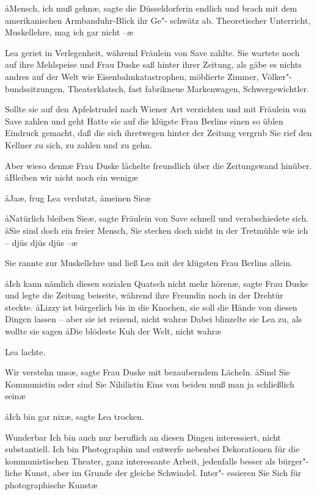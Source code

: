 \aa{}Mensch, ich muß gehn\ae{}, sagte die Düsseldorferin endlich und
brach mit dem amerikanischen Armbanduhr-Blick ihr Ge"-%
schwätz ab. \aanah{}Theoretischer Unterricht, Muskellehre, mag ich
gar nicht --\ae{}

Lea geriet in Verlegenheit, während Fräulein von Save
zahlte. Sie wartete noch auf ihre Mehlspeise und Frau Duske
saß hinter ihrer Zeitung, als gäbe es nichts andres auf der
Welt wie Eisenbahnkatastrophen, möblierte Zimmer, Völker"-%
bundssitzungen, Theaterklatsch, fast fabrikneue Markenwagen,
Schwergewichtler.

Sollte sie auf den Apfelstrudel nach Wiener Art verzichten
und mit Fräulein von Save zahlen und geht\frag{} Hatte sie auf
die klügste Frau Berlins einen so üblen Eindruck gemacht,
daß die sich ihretwegen hinter der Zeitung vergrub\frag{} Sie rief
den Kellner zu sich, zu zahlen und zu gehn.

\aanah{}Aber wieso denn\frag{}\ae{} Frau Duske lächelte freundlich über die
Zeitungswand hinüber. \aa{}Bleiben wir nicht noch ein wenig\frag{}\ae{}

\aa{}Ja\frag{}\ae{}, frug Lea verdutzt, \aa{}meinen Sie\frag{}\ae{}

\aa{}Natürlich bleiben Sie\ae{}, sagte Fräulein von Save schnell
und verabschiedete sich. \aa{}Sie sind doch ein freier Mensch, Sie
stecken doch nicht in der Tretmühle wie ich -- djüs djüs djüs --\ae{}

Sie rannte zur Muskellehre und ließ Lea mit der klügsten
Frau Berlins allein.

\aa{}Ich kann nämlich diesen sozialen Quatsch nicht mehr hören\ae{},
sagte Frau Duske und legte die Zeitung beiseite, während
ihre Freundin noch in der Drehtür steckte. \aa{}Lizzy ist bürgerlich
bis in die Knochen, sie soll die Hände von diesen Dingen lassen
-- aber sie ist reizend, nicht wahr\frag{}\ae{} Dabei blinzelte sie Lea
zu, als wollte sie sagen\dopp{} \aa{}Die blödeste Kuh der Welt, nicht
wahr\frag{}\ae{}

Lea lachte.

\aanah{}Wir verstehn uns\ae{}, sagte Frau Duske mit bezauberndem
Lächeln. \aa{}Sind Sie Kommunistin oder sind Sie Nihilistin\frag{}
Eins von beiden muß man ja schließlich sein\frag{}\ae{}

\aa{}Ich bin gar nix\ae{}, sagte Lea trocken.

\aanah{}Wunderbar\ausr{} Ich bin auch nur beruflich an diesen Dingen
interessiert, nicht substantiell. Ich bin Photographin und
entwerfe nebenbei Dekorationen für die kommunistischen
Theater, ganz interessante Arbeit, jedenfalls besser als bürger"-%
liche Kunst, aber im Grunde der gleiche Schwindel. Inter"-%
essieren Sie Sich\eingriff{eS60-1}{Sich ] sich} für photographische Kunst\frag{}\ae{}

